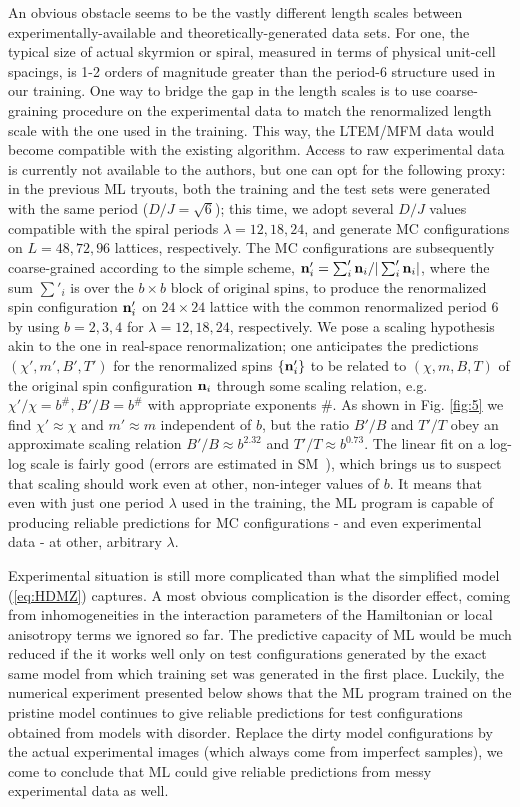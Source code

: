 \documentclass[reprint,amsmath,amssymb,aps,showpacs,superscriptaddress,prl]{revtex4-1}
\renewcommand{\v}[1]{{\bf #1}}
\begin{document}
An obvious obstacle seems to be the vastly different length scales between experimentally-available and theoretically-generated data sets. For one, the typical size of actual skyrmion or spiral, measured in terms of physical unit-cell spacings, is 1-2 orders of magnitude greater than the period-6 structure used in our training. One way to bridge the gap in the length scales is to use coarse-graining procedure on the experimental data to match the renormalized length scale with the one used in the training. This way, the LTEM/MFM data would become compatible with the existing algorithm. Access to raw experimental data is currently not available to the authors, but one can opt for the following  proxy: in the previous ML tryouts, both the training and the test sets were generated with the same period ($D/J=\sqrt{6}$); this time, we adopt several $D/J$ values compatible with the spiral periods $\lambda=12, 18, 24$, and generate MC configurations on $L=48, 72, 96$ lattices, respectively. The MC configurations are subsequently coarse-grained according to the simple scheme, $\v n'_i = \sum'_i \v n_i / | \sum'_i \v n_i  |$, where the sum $\sum'_i$ is over the $b\times b$ block of original spins, to produce the renormalized spin configuration $\v n'_i$ on $24\times24$ lattice with the common renormalized period 6 by using $b=2,3,4$ for $\lambda=12, 18, 24$, respectively. We pose a scaling hypothesis akin to the one in real-space renormalization; one anticipates the predictions $(\chi',  m',  B' , T')$ for the renormalized spins $\{ \v n'_i \}$ to be related to $(\chi, m, B, T)$ of the original spin configuration $\v n_i$ through some scaling relation, e.g. $\chi'/\chi = b^{\#}, B'/B = b^{\#}$ with appropriate exponents $\#$. As shown in Fig. \ref{fig:5} we find $\chi' \approx \chi$ and $m' \approx m$ independent of $b$, but the ratio  $B'/B$  and $T'/T$ obey an approximate scaling relation $B'/B \approx b^{2.32}$ and $T'/T \approx b^{0.73}$. The linear fit on a log-log scale is fairly good (errors are estimated in SM~\cite{SM}), which brings us to suspect that scaling should work even at other, non-integer values of $b$. It means that even with just one period $\lambda$ used in the training, the ML program is capable of producing reliable predictions for MC configurations - and even experimental data - at other, arbitrary  $\lambda$. 

Experimental situation is still more complicated than what the simplified model (\ref{eq:HDMZ}) captures. A most obvious complication is the disorder effect, coming from inhomogeneities in the interaction parameters of the Hamiltonian or local anisotropy terms we ignored so far. The predictive capacity of ML would be much reduced if the it works well only on test  configurations generated by the exact same model from which training set was generated in the first place. Luckily, the numerical experiment presented below shows that the ML program trained on the pristine model continues to give reliable predictions for test configurations obtained from models with disorder. Replace the dirty model configurations by the actual experimental images (which always come from imperfect samples), we come to conclude that ML could give reliable predictions from messy experimental data as well.
\end{document}
